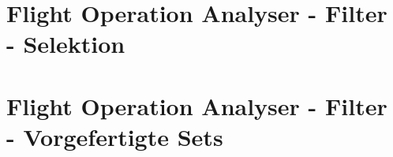 \begin{appendices}
\begin{figure}[h]
\end{figure}
\newpage



\section{Flight Operation Analyser - Filter - Selektion}
\label{appendix:foa_filter_2}

\begin{figure}[h]
\end{figure}
\newpage


\section{Flight Operation Analyser - Filter - Vorgefertigte Sets}
\label{appendix:foa_filter_3}

\begin{figure}[h]
\end{figure}
\newpage



\end{appendices}

